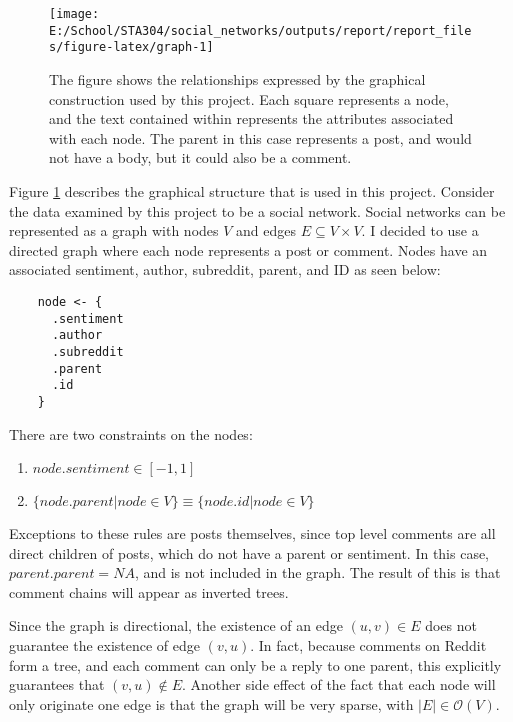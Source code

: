 \documentclass[
]{article}
\providecommand{\tightlist}{%
  \setlength{\itemsep}{0pt}\setlength{\parskip}{0pt}}
\begin{document}
\begin{figure}

{\centering \texttt{[image: E:/School/STA304/social\_networks/outputs/report/report\_files/figure-latex/graph-1]} 

}

\caption{The figure shows the relationships expressed by the graphical construction used by this project. Each square represents a node, and the text contained within represents the attributes associated with each node. The parent in this case represents a post, and would not have a body, but it could also be a comment.}\label{fig:graph}
\end{figure}

Figure \ref{fig:graph} describes the graphical structure that is used in this project. Consider the data examined by this project to be a social network. Social networks can be represented as a graph with nodes \(V\) and edges \(E\subseteq V\times V\). I decided to use a directed graph where each node represents a post or comment. Nodes have an associated sentiment, author, subreddit, parent, and ID as seen below:

\begin{verbatim}
    node <- {
      .sentiment
      .author
      .subreddit
      .parent
      .id
    }
\end{verbatim}

There are two constraints on the nodes:

\begin{enumerate}
\def\labelenumi{\arabic{enumi}.}
\tightlist
\item
  \(node.sentiment\in[-1,1]\)
\item
  \(\{node.parent|node\in V\}\equiv \{node.id|node\in V\}\)
\end{enumerate}

Exceptions to these rules are posts themselves, since top level comments are all direct children of posts, which do not have a parent or sentiment. In this case, \(parent.parent=NA\), and is not included in the graph. The result of this is that comment chains will appear as inverted trees.

Since the graph is directional, the existence of an edge \((u,v)\in E\) does not guarantee the existence of edge \((v,u)\). In fact, because comments on Reddit form a tree, and each comment can only be a reply to one parent, this explicitly guarantees that \((v,u)\not\in E\). Another side effect of the fact that each node will only originate one edge is that the graph will be very sparse, with \(|E|\in\mathcal{O}(V)\).
\end{document}
